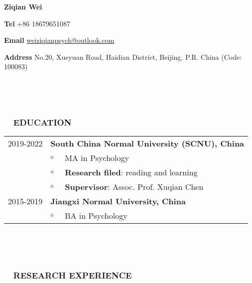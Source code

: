 \documentclass[a4paper, 12pt]{article}
\begin{document}

\centerline{\large\bf Ziqian Wei}
\centerline{\textbf{Tel} +86 18679651087}
\centerline{\textbf{Email} \href{mailto: weiziqianpsych@outlook.com}{weiziqianpsych@outlook.com}}
\centerline{\textbf{Address} No.20, Xueyuan Road, Haidian District, Beijing, P.R. China (Code: 100083)}

\  \par 
\  \par 

\subsubsection*{ \ \ EDUCATION}


\begin{tabularx}{\textwidth}{p{2cm} p{0.1cm} X}

    2019-2022 & \multicolumn{2}{X}{\textbf{South China Normal University (SCNU), China}} \\
    & $\circ$ & MA in Psychology \\
    & $\circ$ & \textbf{Research filed}: reading and learning \\
    & $\circ$ & \textbf{Supervisor}: Assoc. Prof. Xuqian Chen \\

    2015-2019 & \multicolumn{2}{X}{\textbf{Jiangxi Normal University, China}} \\
    & $\circ$ & BA in Psychology \\
    
    \end{tabularx}



\  \par 
\  \par 


\subsubsection*{ \ \ RESEARCH EXPERIENCE}
\end{document}
